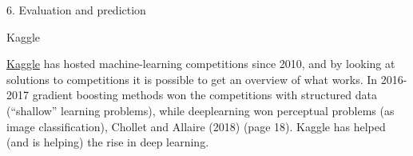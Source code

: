 \documentclass[10pt,ignorenonframetext,]{beamer}
\newenvironment{Shaded}{\begin{snugshade}}{\end{snugshade}}
\newcommand{\DecValTok}[1]{\textcolor[rgb]{0.00,0.00,0.81}{#1}}
\newcommand{\FloatTok}[1]{\textcolor[rgb]{0.00,0.00,0.81}{#1}}
\newcommand{\StringTok}[1]{\textcolor[rgb]{0.31,0.60,0.02}{#1}}
\newcommand{\OperatorTok}[1]{\textcolor[rgb]{0.81,0.36,0.00}{\textbf{#1}}}
\newcommand{\ErrorTok}[1]{\textcolor[rgb]{0.64,0.00,0.00}{\textbf{#1}}}
\newcommand{\NormalTok}[1]{#1}
\begin{document}
\begin{frame}[fragile]
\begin{block}{6. Evaluation and prediction}
\begin{Shaded}
\end{Shaded}

\end{block}

\end{frame}

\begin{frame}

\begin{block}{Kaggle}

\href{https://www.kaggle.com/}{Kaggle} has hosted machine-learning
competitions since 2010, and by looking at solutions to competitions it
is possible to get an overview of what works. In 2016-2017 gradient
boosting methods won the competitions with structured data (``shallow''
learning problems), while deeplearning won perceptual problems (as image
classification), Chollet and Allaire (2018) (page 18). Kaggle has helped
(and is helping) the rise in deep learning.

\end{block}

\end{frame}
\end{document}
